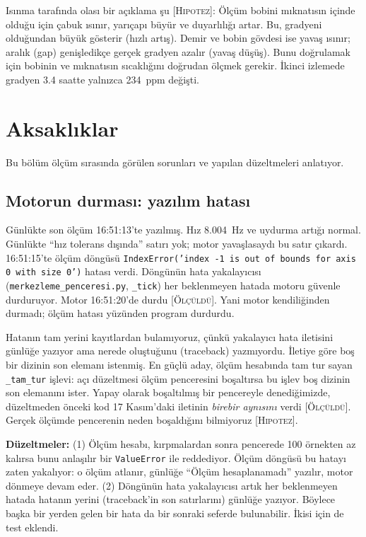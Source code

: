 \documentclass[11pt,a4paper]{article}
\newcommand{\kod}[1]{\texttt{#1}}
\newcommand{\olc}{\textsc{[Ölçüldü]}}
\newcommand{\hip}{\textsc{[Hipotez]}}
\begin{document}
Isınma tarafında olası bir açıklama şu \hip: Ölçüm bobini mıknatısın içinde olduğu için çabuk ısınır, yarıçapı büyür ve
duyarlılığı artar. Bu, gradyeni olduğundan büyük gösterir (hızlı artış). Demir ve bobin gövdesi ise
yavaş ısınır; aralık (gap) genişledikçe gerçek gradyen azalır (yavaş düşüş). Bunu doğrulamak için bobinin
ve mıknatısın sıcaklığını doğrudan ölçmek gerekir. İkinci izlemede gradyen 3.4 saatte yalnızca 234~ppm
değişti.

\section{Aksaklıklar}
\label{sec:aksak}

Bu bölüm ölçüm sırasında görülen sorunları ve yapılan düzeltmeleri anlatıyor.

\subsection{Motorun durması: yazılım hatası}
Günlükte son ölçüm 16:51:13'te yazılmış. Hız 8.004~Hz ve uydurma artığı normal. Günlükte ``hız tolerans
dışında'' satırı yok; motor yavaşlasaydı bu satır çıkardı. 16:51:15'te ölçüm döngüsü
\kod{IndexError('index -1 is out of bounds for axis 0 with size 0')} hatası verdi. Döngünün hata yakalayıcısı
(\kod{merkezleme\_penceresi.py}, \kod{\_tick}) her beklenmeyen hatada motoru güvenle durduruyor. Motor
16:51:20'de durdu \olc. Yani motor kendiliğinden durmadı; ölçüm hatası yüzünden program durdurdu.

Hatanın tam yerini kayıtlardan bulamıyoruz, çünkü yakalayıcı hata iletisini günlüğe yazıyor ama nerede
oluştuğunu (traceback) yazmıyordu. İletiye göre boş bir dizinin son elemanı istenmiş. En güçlü aday, ölçüm
hesabında tam tur sayan \kod{\_tam\_tur} işlevi: açı düzeltmesi ölçüm penceresini boşaltırsa bu işlev boş
dizinin son elemanını ister. Yapay olarak boşaltılmış bir pencereyle denediğimizde, düzeltmeden önceki kod
17 Kasım'daki iletinin \emph{birebir aynısını} verdi \olc. Gerçek ölçümde pencerenin neden boşaldığını
bilmiyoruz \hip.

\textbf{Düzeltmeler:} (1) Ölçüm hesabı, kırpmalardan sonra pencerede 100 örnekten az kalırsa bunu
anlaşılır bir \kod{ValueError} ile reddediyor. Ölçüm döngüsü bu hatayı zaten yakalıyor: o ölçüm atlanır,
günlüğe ``Ölçüm hesaplanamadı'' yazılır, motor dönmeye devam eder. (2) Döngünün hata yakalayıcısı artık her
beklenmeyen hatada hatanın yerini (traceback'in son satırlarını) günlüğe yazıyor. Böylece başka bir yerden
gelen bir hata da bir sonraki seferde bulunabilir. İkisi için de test eklendi.
\end{document}
